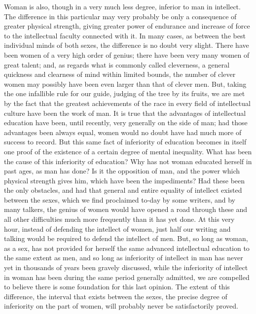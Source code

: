 \begin{linenumbers*}
\indent Woman is also, though in a very much less degree, inferior to man in intellect. The difference in this particular may very probably be only a consequence of greater physical strength, giving greater power of endurance and increase of force to the intellectual faculty connected with it. In many cases, as between the best individual minds of both sexes, the difference is no doubt very slight. There have been women of a very high order of genius; there have been very many women of great talent; and, as regards what is commonly called cleverness, a general quickness and clearness of mind within limited bounds, the number of clever women may possibly have been even larger than that of clever men. But, taking the one infallible rule for our guide, judging of the tree by its fruits, we are met by the fact that the greatest achievements of the race in every field of intellectual culture have been the work of man. It is true that the advantages of intellectual education have been, until recently, very generally on the side of man; had those advantages been always equal, women would no doubt have had much more of success to record. But this same fact of inferiority of education becomes in itself one proof of the existence of a certain degree of mental inequality. What has been the cause of this inferiority of education? Why has not woman educated herself in past ages, as man has done? Is it the opposition of man, and the power which physical strength gives him, which have been the impediments? Had these been the only obstacles, and had that general and entire equality of intellect existed between the sexes, which we find proclaimed to-day by some writers, and by many talkers, the genius of women would have opened a road through these and all other difficulties much more frequently than it has yet done. At this very hour, instead of defending the intellect of women, just half our writing and talking would be required to defend the intellect of men. But, so long as woman, as a sex, has not provided for herself the same advanced intellectual education to the same extent as men, and so long as inferiority of intellect in man has never yet in thousands of years been gravely discussed, while the inferiority of intellect in woman has been during the same period generally admitted, we are compelled to believe there is some foundation for this last opinion. The extent of this difference, the interval that exists between the sexes, the precise degree of inferiority on the part of women, will probably never be satisfactorily proved.


\end{linenumbers*}
